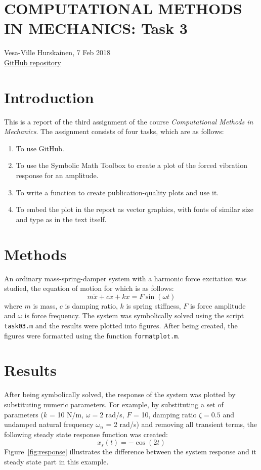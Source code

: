 \documentclass{article}
\begin{document}
	\section*{COMPUTATIONAL METHODS IN MECHANICS: Task 3}
	Vesa-Ville Hurskainen, 7 Feb 2018\\
	\href{https://github.com/VesaVilleHurskainen/cmim2018}{GitHub repository}

	\section*{Introduction}
	This is a report of the third assignment of the course \textit{Computational Methods in Mechanics}. The assignment consists of four tasks, which are as follows:
	
	\begin{enumerate}
		\setlength\itemsep{0pt}
		\item To use GitHub.
		\item To use the Symbolic Math Toolbox to create a plot of the forced vibration response for an amplitude.
		\item To write a function to create publication-quality plots and use it.
		\item To embed the plot in the report as vector graphics, with fonts of similar size and type as in the text itself.
	\end{enumerate}

	\section*{Methods}
	An ordinary mass-spring-damper system with a harmonic force excitation was studied, the equation of motion for which is as follows:
	\begin{equation}
		m \ddot{x} + c \dot{x} + k x = F \sin(\omega t)
	\end{equation}
	where $m$ is mass, $c$ is damping ratio, $k$ is spring stiffness, $F$ is force amplitude and $\omega$ is force frequency. The system was symbolically solved using the script \texttt{task03.m} and the results were plotted into figures. After being created, the figures were formatted using the function \texttt{formatplot.m}.

	\section*{Results}
	After being symbolically solved, the response of the system was plotted by substituting numeric parameters. For example, by substituting a set of parameters ($k$ = 10 N/m, $\omega = 2$ rad/s, $F$ = 10, damping ratio $\zeta = 0.5$ and undamped natural frequency $\omega_n$ = 2 rad/s) and removing all transient terms, the following steady state response function was created:
	\begin{equation}
		x_s(t) = - \cos(2t)
	\end{equation}
	Figure~\ref*{fig:response} illustrates the difference between the system response and it steady state part in this example.
		
\end{document}
